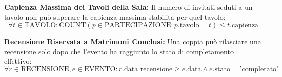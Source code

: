 \begin{enumerate}[label=\textbf{[V-\arabic*]}]
    \item \textbf{Capienza Massima dei Tavoli della Sala:} Il numero di invitati seduti a un tavolo non può superare la capienza massima stabilita per quel tavolo:
    \[ \forall t \in \text{TAVOLO} : \text{COUNT}(p \in \text{PARTECIPAZIONE} : p.\text{tavolo} = t) \le t.\text{capienza} \]
    
    \item \textbf{Recensione Riservata a Matrimoni Conclusi:} Una coppia può rilasciare una recensione solo dopo che l'evento ha raggiunto lo stato di completamento effettivo:
    \[ \forall r \in \text{RECENSIONE}, e \in \text{EVENTO} : r.\text{data\_recensione} \ge e.\text{data} \land e.\text{stato} = \text{'completato'} \]
\end{enumerate}
